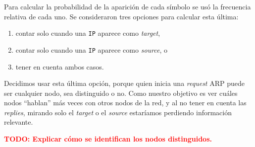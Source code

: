 \begin{enumerate}
    Para calcular la probabilidad de la aparición de cada símbolo se usó la
    frecuencia relativa de cada uno. Se consideraron tres opciones para
    calcular esta última:
    \begin{enumerate}
        \item contar solo cuando una \texttt{IP} aparece como \emph{target},
        \item contar solo cuando una \texttt{IP} aparece como \emph{source}, o
        \item tener en cuenta ambos casos.
    \end{enumerate}
    Decidimos usar esta última opción, porque quien inicia una \emph{request}
    ARP puede ser cualquier nodo, sea distinguido o no. Como nuestro objetivo
    es ver cuáles nodos ``hablan'' más veces con otros nodos de la red, y al
    no tener en cuenta las \emph{replies}, mirando solo el \emph{target} o el
    \emph{source} estaríamos perdiendo información relevante.

    \textcolor{red}{\textbf{TODO: Explicar cómo se identifican los nodos distinguidos.}}

\end{enumerate}

